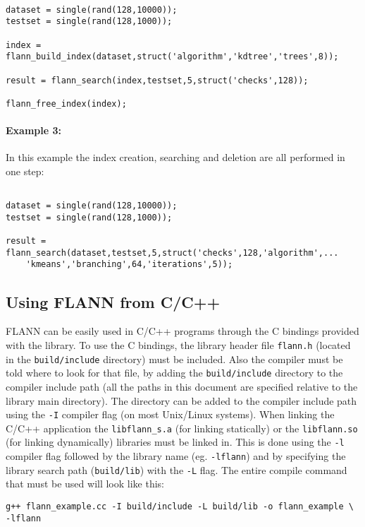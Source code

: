 \documentclass[letter,10pt]{article}
\begin{document}
\begin{Verbatim}[fontsize=\footnotesize,frame=single]

dataset = single(rand(128,10000));
testset = single(rand(128,1000));

index = flann_build_index(dataset,struct('algorithm','kdtree','trees',8));

result = flann_search(index,testset,5,struct('checks',128));

flann_free_index(index);

\end{Verbatim}

\paragraph{Example 3:}

In this example the index creation, searching and deletion are all performed in one step:

\begin{Verbatim}[fontsize=\footnotesize,frame=single]

dataset = single(rand(128,10000));
testset = single(rand(128,1000));

result = flann_search(dataset,testset,5,struct('checks',128,'algorithm',...
    'kmeans','branching',64,'iterations',5));

\end{Verbatim}

\subsection{Using FLANN from C/C++}

FLANN can be easily used in C/C++ programs through the C bindings provided
with the library. To use the C bindings, the library header file
\texttt{flann.h} (located in the \texttt{build/include} directory) must be
included. Also the compiler must be told where to look for that file, by
adding the \texttt{build/include} directory to the compiler include path
(all the paths in this document are specified relative to the library main
directory). The directory can be added to the compiler include
path using the \texttt{-I} compiler flag (on most Unix/Linux systems). When
linking the C/C++ application the \texttt{libflann\_s.a} (for linking statically) or
the \texttt{libflann.so} (for linking dynamically) libraries must be linked in. 
This is done using the \texttt{-l} compiler flag followed by the library name
(eg. \texttt{-lflann}) and by specifying the library search path
(\texttt{build/lib}) with the \texttt{-L} flag. The entire compile command
that must be used will look like this:
\begin{Verbatim}[fontsize=\footnotesize]
g++ flann_example.cc -I build/include -L build/lib -o flann_example \
-lflann
\end{Verbatim}
\end{document}
